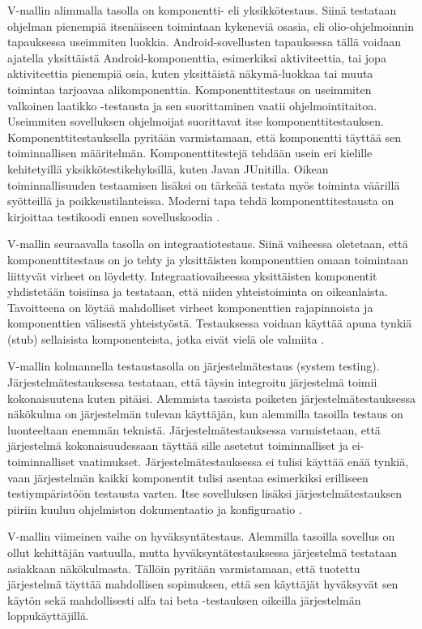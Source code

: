V-mallin alimmalla tasolla on komponentti- eli yksikkötestaus. Siinä testataan ohjelman pienempiä itsenäiseen toimintaan kykeneviä osasia, eli olio-ohjelmoinnin tapauksessa useimmiten luokkia. Android-sovellusten tapauksessa tällä voidaan ajatella yksittäistä Android-komponenttia, esimerkiksi aktiviteettia, tai jopa aktiviteettia pienempiä osia, kuten yksittäistä näkymä-luokkaa tai muuta toimintaa tarjoavaa alikomponenttia. Komponenttitestaus on useimmiten valkoinen laatikko -testausta ja sen suorittaminen vaatii ohjelmointitaitoa. Useimmiten sovelluksen ohjelmoijat suorittavat itse komponenttitestauksen. Komponenttitestauksella pyritään varmistamaan, että komponentti täyttää sen toiminnallisen määritelmän. Komponenttitestejä tehdään usein eri kielille kehitetyillä yksikkötestikehyksillä, kuten Javan JUnitilla. Oikean toiminnallisuuden testaamisen lisäksi on tärkeää testata myös toiminta väärillä syötteillä ja poikkeustilanteissa. Moderni tapa tehdä komponenttitestausta on kirjoittaa testikoodi ennen sovelluskoodia \cite[43-50]{testing_foundations}.

V-mallin seuraavalla tasolla on integraatiotestaus. Siinä vaiheessa oletetaan, että komponenttitestaus on jo tehty ja yksittäisten komponenttien omaan toimintaan liittyvät virheet on löydetty. Integraatiovaiheessa yksittäisten komponentit yhdistetään toisiinsa ja testataan, että niiden yhteistoiminta on oikeanlaista. Tavoitteena on löytää mahdolliset virheet komponenttien rajapinnoista ja komponenttien välisestä yhteistyöstä. Testauksessa voidaan käyttää apuna tynkiä (stub) sellaisista komponenteista, jotka eivät vielä ole valmiita \cite[50-52]{testing_foundations}.

V-mallin kolmannella testaustasolla on järjestelmätestaus (system testing). Järjestelmätestauksessa testataan, että täysin integroitu järjestelmä toimii kokonaisuutena kuten pitäisi. Alemmista tasoista poiketen järjestelmätestauksessa näkökulma on järjestelmän tulevan käyttäjän, kun alemmilla tasoilla testaus on luonteeltaan enemmän teknistä. Järjestelmätestauksessa varmistetaan, että järjestelmä kokonaisuudessaan täyttää sille asetetut toiminnalliset ja ei-toiminnalliset vaatimukset. Järjestelmätestauksessa ei tulisi käyttää enää tynkiä, vaan järjestelmän kaikki komponentit tulisi asentaa esimerkiksi erilliseen testiympäristöön testausta varten. Itse sovelluksen lisäksi järjestelmätestauksen piiriin kuuluu ohjelmiston dokumentaatio ja konfiguraatio \cite[58-61]{testing_foundations}.

V-mallin viimeinen vaihe on hyväksyntätestaus. Alemmilla tasoilla sovellus on ollut kehittäjän vastuulla, mutta hyväksyntätestauksessa järjestelmä testataan asiakkaan näkökulmasta. Tällöin pyritään varmistamaan, että tuotettu järjestelmä täyttää mahdollisen sopimuksen, että sen käyttäjät hyväksyvät sen käytön sekä mahdollisesti alfa tai beta -testauksen oikeilla järjestelmän loppukäyttäjillä.\cite[62-63]{testing_foundations}

